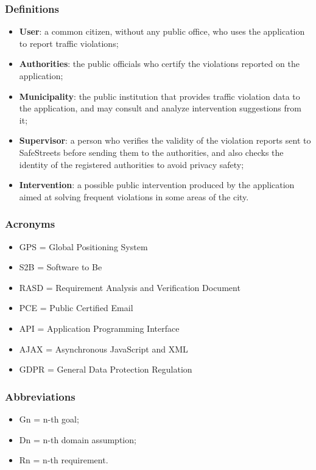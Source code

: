 \subsubsection{Definitions}
	\begin{itemize}
		\item \textbf{User}: a common citizen, without any public office, who uses the application to report traffic violations;
		\item \textbf{Authorities}: the public officials who certify the violations reported on the application;
		\item \textbf{Municipality}: the public institution that provides traffic violation data to the application, and may consult and analyze intervention suggestions from it;
		\item \textbf{Supervisor}: a person who verifies the validity of the violation reports sent to SafeStreets before sending them to the authorities, and also checks the identity of the registered authorities to avoid privacy safety;
		\item \textbf{Intervention}: a possible public intervention produced by the application aimed at solving frequent violations in some areas of the city.
	\end{itemize}
\subsubsection{Acronyms}
\begin{itemize}
	\item GPS = Global Positioning System
	\item S2B = Software to Be
	\item RASD = Requirement Analysis and Verification Document
	\item PCE = Public Certified Email
	\item API = Application Programming Interface
	\item AJAX = Asynchronous JavaScript and XML
	\item GDPR = General Data Protection Regulation
\end{itemize}
\subsubsection{Abbreviations}
\begin{itemize}
	\item Gn = n-th goal;
	\item Dn = n-th domain assumption;
	\item Rn = n-th requirement.
\end{itemize}